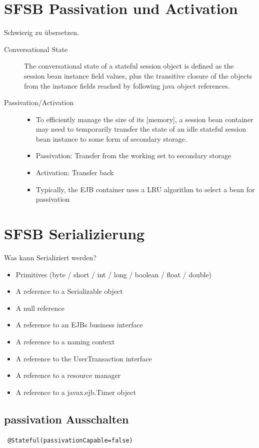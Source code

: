 \documentclass[a4paper,10pt]{scrreprt}
\begin{document}
\section{SFSB Passivation und Activation}
Schwierig zu übersetzen.
\begin{description}
 \item [Conversational State] The conversational state of a stateful session object is defined as the
session bean instance field values, plus the transitive closure of the
objects from the instance fields reached by following java object
references.
\item [Passivation/Activation] \begin{itemize}
                                \item To efficiently manage the size of its [memory], a session bean container
may need to temporarily transfer the state of an idle stateful session bean
instance to some form of secondary storage.
\item Passivation: Transfer from the working set to secondary storage
\item Activation: Transfer back
 \item Typically, the EJB container uses a LRU algorithm to select a bean for
passivation
                               \end{itemize}

\end{description}

\section{SFSB Serializierung}
Was kann Serializiert werden?
\begin{itemize}
 \item Primitives (byte / short / int / long / boolean / float / double)
\item A reference to a Serializable object
\item A null reference
\item A reference to an EJBs business interface
\item A reference to a naming context
\item A reference to the UserTransaction interface
\item A reference to a resource manager
\item A reference to a javax.ejb.Timer object
\end{itemize}

\subsection{passivation Ausschalten}
\begin{verbatim}
 @Stateful(passivationCapable=false)
\end{verbatim}
\end{document}
